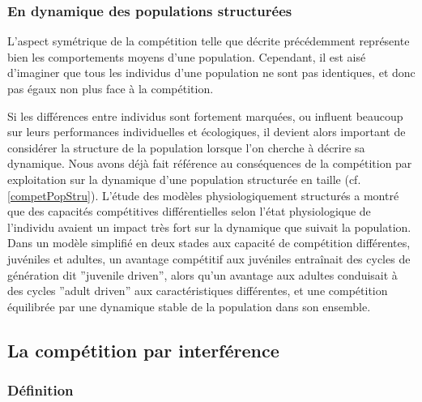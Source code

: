 \subsubsection{En dynamique des populations structurées}

L'aspect symétrique de la compétition telle que décrite précédemment représente
bien les comportements moyens d'une population. Cependant, il est aisé
d'imaginer que tous les individus d'une population ne sont pas identiques, et
donc pas égaux non plus face à la compétition. 

Si les différences entre individus sont fortement marquées, ou influent
beaucoup sur leurs performances individuelles et écologiques, il devient alors
important de considérer la structure de la population lorsque l'on cherche à
décrire sa dynamique. Nous avons déjà fait référence au conséquences de la
compétition par exploitation sur la dynamique d'une population structurée en
taille (cf. \ref{competPopStru}). L'étude des modèles physiologiquement
structurés a montré que des capacités compétitives différentielles selon l'état
physiologique de l'individu avaient un impact très fort sur la dynamique que
suivait la population. Dans un modèle simplifié en deux stades aux capacité de
compétition différentes, juvéniles et adultes, un avantage compétitif aux
juvéniles entraînait des cycles de génération dit ''juvenile driven'', alors qu'un
avantage aux adultes conduisait à des cycles ''adult driven'' aux caractéristiques
différentes, et une compétition équilibrée par une dynamique stable de la
population dans son ensemble. 


\subsection{La compétition par interférence}

\subsubsection{Définition}

